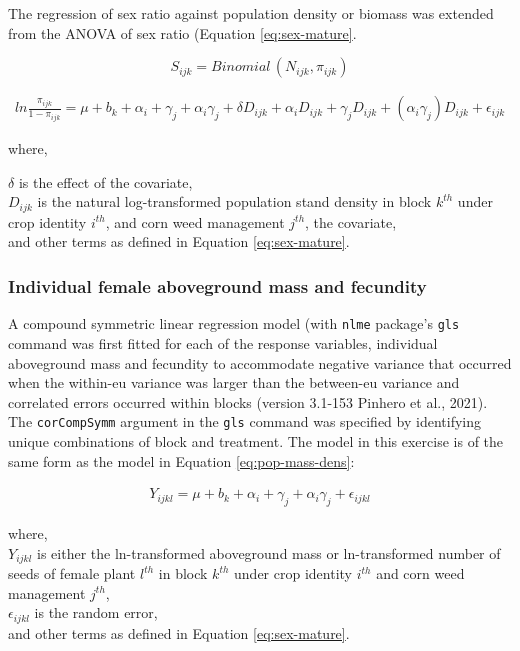 \documentclass[
]{article}
\begin{document}
The regression of sex ratio against population density or biomass was extended from the ANOVA of sex ratio (Equation \eqref{eq:sex-mature}.

\[ S_{ijk} = Binomial\,(N_{ijk},\pi_{ijk}) \]

\begin{align}
ln \frac{\pi_{ijk}}{1-\pi_{ijk}} = \mu + b_k + \alpha_i + \gamma_j +\alpha_i \gamma_j + \delta D_{ijk}  + \alpha_i D_{ijk} + \gamma_j D_{ijk} + (\alpha_i \gamma_j)D_{ijk} + \epsilon_{ijk} \label{eq:sex-mature-anc}
\end{align}

where,

\(\delta\) is the effect of the covariate,\\
\(D_{ijk}\) is the natural log-transformed population stand density in block \(k^{th}\) under crop identity \(i^{th}\), and corn weed management \(j^{th}\), the covariate,\\
and other terms as defined in Equation \eqref{eq:sex-mature}.

\hypertarget{individual-female-aboveground-mass-and-fecundity-1}{%
\subsubsection*{Individual female aboveground mass and fecundity}\label{individual-female-aboveground-mass-and-fecundity-1}}

A compound symmetric linear regression model (with \texttt{nlme} package's \texttt{gls} command was first fitted for each of the response variables, individual aboveground mass and fecundity to accommodate negative variance that occurred when the within-eu variance was larger than the between-eu variance and correlated errors occurred within blocks (version 3.1-153 Pinhero et al., 2021).
The \texttt{corCompSymm} argument in the \texttt{gls} command was specified by identifying unique combinations of block and treatment. The model in this exercise is of the same form as the model in Equation \eqref{eq:pop-mass-dens}:

\begin{align}
Y_{ijkl} = \mu + b_k + \alpha_i + \gamma_j +\alpha_i \gamma_j + \epsilon_{ijkl} \label{eq:indiv-mass-fecund}
\end{align}

where,\\
\(Y_{ijkl}\) is either the ln-transformed aboveground mass or ln-transformed number of seeds of female plant \(l^{th}\) in block \(k^{th}\) under crop identity \(i^{th}\) and corn weed management \(j^{th}\),\\
\(\epsilon_{ijkl}\) is the random error,\\
and other terms as defined in Equation \eqref{eq:sex-mature}.
\end{document}
